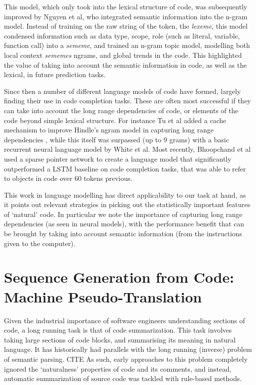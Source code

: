 This model, which only took into the lexical structure of code, was subsequently improved by Nguyen et al\cite{nguyen_statistical_2013}, who integrated semantic information into the n-gram model.
Instead of training on the raw string of the token, the \textit{lexeme}, this model condensed information such as data type, scope, role (such as literal, variable, function call) into a \textit{sememe}, and trained an n-gram topic model, modelling both local context \textit{sememes} ngrams, and global trends in the code.
This highlighted the value of taking into account the semantic information in code, as well as the lexical, in future prediction tasks.

Since then a number of different language models of code have formed, largely finding their use in code completion tasks. These are often most successful if they can take into account the long range dependencies of code, or elements of the code beyond simple lexical structure. For instance Tu et al added a cache mechanism to improve Hindle's ngram model in capturing long range dependencies  \cite{tu_localness_nodate}, while this itself was surpassed (up to 9 grams) with a basic recurrent neural language model by White et al\cite{white_toward_2015}.
Most recently, Bhoopchand et al used a sparse pointer network to create a language model that significantly outperformed a LSTM baseline on code completion tasks, that was able to refer to objects in code over 60 tokens previous\cite{bhoopchand_learning_2016}.

This work in language modelling has direct applicability to our task at hand, as it points out relevant strategies in picking out the statistically important features of `natural' code. In particular we note the importance of capturing long range dependencies (as seen in neural models), with the performance benefit that can be brought by taking into account semantic information (from the instructions given to the computer).

\section{Sequence Generation from Code: Machine Pseudo-Translation}

Given the industrial importance of software engineers understanding sections of code, a long running task is that of code summarization. 
This task involves taking large sections of code blocks, and summarising its meaning in natural language. It has historically had parallels with the long running (inverse) problem of semantic parsing. CITE
As such, early approaches to this problem completely ignored the `naturalness' properties of code and its comments, and instead, automatic summarization of source code was tackled with rule-based methods. 


